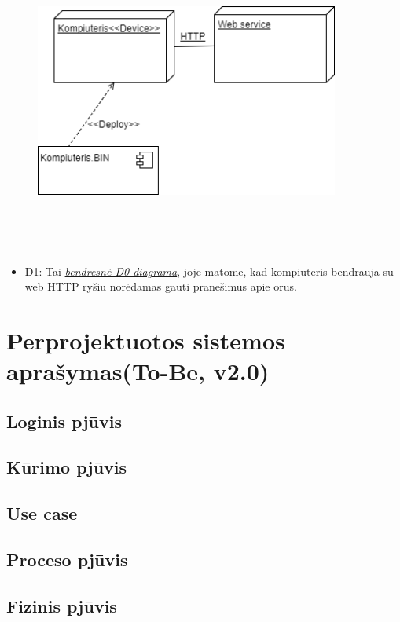 \documentclass[oneside]{VUMIFPSkursinis}
\begin{document}
		\begin{figure}[H]
		\centering	
	\includegraphics[width=10cm,height=10cm,keepaspectratio]{Deployment0.png}
	\caption{}
	\label{fig:Deployment0}
\end{figure}
	\begin{itemize}
		\item D1: Tai \hyperref[fig:Deployment0]{\textit{bendresnė D0 diagrama}}, joje matome, kad kompiuteris bendrauja su web HTTP ryšiu norėdamas gauti pranešimus apie orus.
	\end{itemize}

\section{Perprojektuotos sistemos aprašymas(To-Be, v2.0)}

\subsection{Loginis pjūvis}
\subsection{Kūrimo pjūvis}
\subsection{Use case}
\subsection{Proceso pjūvis}
\subsection{Fizinis pjūvis}



\end{document}
